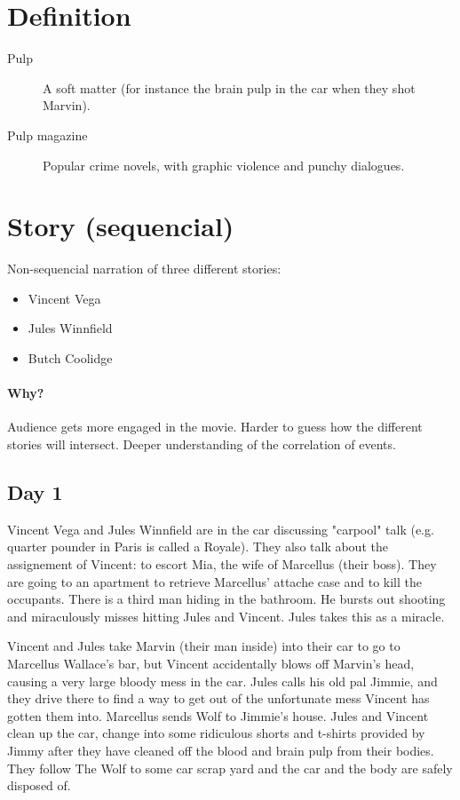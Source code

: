 \documentclass[a4paper,12pt]{article}
\begin{document}
\section{Definition}

\begin{description}
    \item [Pulp] A soft matter (for instance the brain pulp in the car when they
    shot Marvin).
    \item [Pulp magazine] Popular crime novels, with graphic violence and punchy
    dialogues.
\end{description}

\section{Story (sequencial)}

Non-sequencial narration of three different stories:
\begin{itemize}
    \item Vincent Vega
    \item Jules Winnfield
    \item Butch Coolidge
\end{itemize}

\paragraph{Why?} Audience gets more engaged in the movie. Harder to guess how
the different stories will intersect. Deeper understanding of the correlation of events.


\subsection*{Day 1}

Vincent Vega and Jules Winnfield are in the car discussing "carpool" talk (e.g.
quarter pounder in Paris is called a Royale). They also talk about the assignement
of Vincent: to escort Mia, the wife of Marcellus (their boss). They are going to
an apartment to retrieve Marcellus' attache case and to kill the occupants. There
is a third man hiding in the bathroom. He bursts out shooting and miraculously
misses hitting Jules and Vincent. Jules takes this as a miracle.

Vincent and Jules take Marvin (their man inside) into their car to go to Marcellus
Wallace's bar, but Vincent accidentally blows off Marvin's head, causing a very
large bloody mess in the car. Jules calls his old pal Jimmie, and they drive there
to find a way to get out of the unfortunate mess Vincent has gotten them into.
Marcellus sends Wolf to Jimmie's house. Jules and Vincent clean up the car, change
into some ridiculous shorts and t-shirts provided by
Jimmy after they have cleaned off the blood and brain pulp from their bodies.
They follow The Wolf to some car scrap yard and the car and the body are
safely disposed of.
\end{document}

